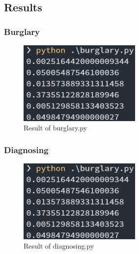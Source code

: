\documentclass[a4paper, 11pt]{article}
\begin{document}
\subsection{Results}
\subsubsection{Burglary}
\begin{figure}[H]
  \centering
  \includegraphics[width=6cm]{burglary.png}
  \caption{Result of burglary.py}
\end{figure}
\subsubsection{Diagnosing}
\begin{figure}[H]
  \centering
  \includegraphics[width=6cm]{burglary.png}
  \caption{Result of diagnosing.py}
\end{figure}

%
%
\end{document}
